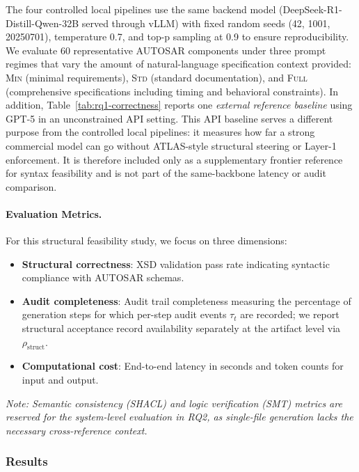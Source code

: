 \documentclass[acmlarge,nonacm]{acmart}
\theoremstyle{acmplain}
\theoremstyle{acmdefinition}
\begin{document}
The four controlled local pipelines use the same backend model (DeepSeek-R1-Distill-Qwen-32B served through vLLM) with fixed random seeds (42, 1001, 20250701), temperature 0.7, and top-p sampling at 0.9 to ensure reproducibility. We evaluate 60 representative AUTOSAR components under three prompt regimes that vary the amount of natural-language specification context provided: \textsc{Min} (minimal requirements), \textsc{Std} (standard documentation), and \textsc{Full} (comprehensive specifications including timing and behavioral constraints). In addition, Table~\ref{tab:rq1-correctness} reports one \emph{external reference baseline} using GPT-5 in an unconstrained API setting. This API baseline serves a different purpose from the controlled local pipelines: it measures how far a strong commercial model can go without ATLAS-style structural steering or Layer-1 enforcement. It is therefore included only as a supplementary frontier reference for syntax feasibility and is not part of the same-backbone latency or audit comparison.

\paragraph{Evaluation Metrics.} For this structural feasibility study, we focus on three dimensions:

\begin{itemize}[leftmargin=*,itemsep=0.5ex]
\item \textbf{Structural correctness}: XSD validation pass rate indicating syntactic compliance with AUTOSAR schemas.
\item \textbf{Audit completeness}: Audit trail completeness measuring the percentage of generation steps for which per-step audit events $\tau_t$ are recorded; we report structural acceptance record availability separately at the artifact level via $\rho_{\text{struct}}$.
\item \textbf{Computational cost}: End-to-end latency in seconds and token counts for input and output.
\end{itemize}

\textit{Note: Semantic consistency (SHACL) and logic verification (SMT) metrics are reserved for the system-level evaluation in RQ2, as single-file generation lacks the necessary cross-reference context.}


\subsubsection{Results}
\label{sec:rq1-results}
\end{document}
